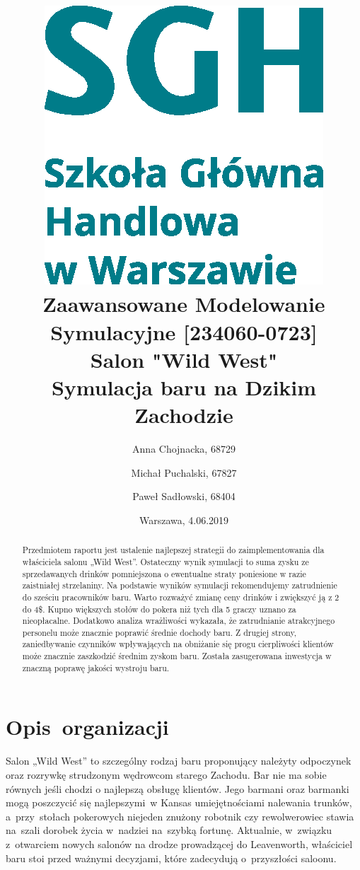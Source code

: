 \documentclass[12pt, a4paper, oneside]{mwart} %
\begin{document}
\title{\includegraphics[width = 0.3 \textwidth]{wykresy/SGHlogotypCMYKpl.eps}\\
\bigskip
Zaawansowane Modelowanie Symulacyjne [234060-0723]\\ 
\bigskip
Salon "Wild West"\\
Symulacja baru na Dzikim Zachodzie}
\author{Anna Chojnacka, 68729 \and
Michał Puchalski, 67827 \and
Paweł Sadłowski, 68404 }
\date{Warszawa, 4.06.2019}
\maketitle

\begin{abstract}
Przedmiotem raportu jest ustalenie najlepszej strategii do zaimplementowania dla właściciela salonu „Wild West”. Ostateczny wynik symulacji to suma zysku ze sprzedawanych drinków pomniejszona o ewentualne straty poniesione w razie zaistniałej strzelaniny. Na podstawie wyników symulacji rekomendujemy zatrudnienie do sześciu pracowników baru. Warto rozważyć zmianę ceny drinków i zwiększyć ją z 2 do 4\$. Kupno większych stołów do pokera niż tych dla 5 graczy uznano za nieopłacalne. Dodatkowo analiza wrażliwości wykazała, że zatrudnianie atrakcyjnego personelu może znacznie poprawić średnie dochody baru. Z drugiej strony, zaniedbywanie czynników wpływających na obniżanie się progu cierpliwości klientów może znacznie zaszkodzić średnim zyskom baru. Została zasugerowana inwestycja w znaczną poprawę jakości wystroju baru. 
\end{abstract}

\pagebreak

\section{Opis~organizacji}
Salon „Wild West” to szczególny rodzaj baru proponujący należyty odpoczynek oraz rozrywkę strudzonym wędrowcom starego Zachodu. Bar nie ma sobie równych jeśli chodzi o najlepszą obsługę klientów. Jego barmani oraz barmanki mogą poszczycić się najlepszymi~w Kansas umiejętnościami nalewania trunków, a~przy~stołach pokerowych niejeden znużony robotnik czy rewolwerowiec stawia na~szali dorobek życia w~nadziei na~szybką fortunę. Aktualnie, w~związku z~otwarciem nowych salonów na drodze prowadzącej do Leavenworth, właściciel baru stoi przed ważnymi decyzjami, które zadecydują o~przyszłości saloonu.
\end{document}
